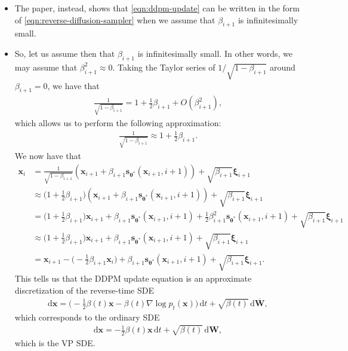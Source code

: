 \documentclass[10pt]{article}
\newcommand{\dee}{\mathrm{d}}
\newcommand{\ve}[1]{\mathbf{#1}}
\newcommand{\ves}[1]{\boldsymbol{#1}}
\begin{document}
\begin{itemize}
  \item The paper, instead, shows that \eqref{eqn:ddpm-update} can be written in the form of \eqref{eqn:reverse-diffusion-sampler} when we assume that $\beta_{i+1}$ is infinitesimally small.
  
  \item So, let us assume then that $\beta_{i+1}$ is infinitesimally small. In other words, we may assume that $\beta_{i+1}^2 \approx 0$. Taking the Taylor series of $1/\sqrt{1-\beta_{i+1}}$ around $\beta_{i+1} = 0$, we have that
  \begin{align*}
    \frac{1}{\sqrt{1 - \beta_{i+1}}} = 1 + \frac{1}{2}\beta_{i+1} + O(\beta_{i+1}^2),
  \end{align*}
  which allows us to perform the following approximation:
  \begin{align*}
    \frac{1}{\sqrt{1 - \beta_{i+1}}} \approx 1 + \frac{1}{2}\beta_{i+1}.
  \end{align*}
  We now have that
  \begin{align*}
    \ve{x}_{i}
    &= \frac{1}{\sqrt{1 - \beta_{i+1}}} (\ve{x}_{i+1} + \beta_{i+1}\ve{s}_{\ves{\theta}^*}(\ve{x}_{i+1}, i+1)) + \sqrt{\beta_{i+1}} \ves{\xi}_{i+1} \\
    &\approx \bigg(1 + \frac{1}{2}\beta_{i+1}\bigg)(\ve{x}_{i+1} + \beta_{i+1}\ve{s}_{\ves{\theta}^*}(\ve{x}_{i+1}, i+1)) + \sqrt{\beta_{i+1}} \ves{\xi}_{i+1} \\
    &= \bigg(1 + \frac{1}{2}\beta_{i+1}\bigg)\ve{x}_{i+1} + \beta_{i+1}\ve{s}_{\ves{\theta}^*}(\ve{x}_{i+1}, i+1) + \frac{1}{2}\beta_{i+1}^2 \ve{s}_{\ves{\theta}^*}(\ve{x}_{i+1}, i+1) + \sqrt{\beta_{i+1}} \ves{\xi}_{i+1} \\
    &\approx \bigg(1 + \frac{1}{2}\beta_{i+1}\bigg)\ve{x}_{i+1} + \beta_{i+1}\ve{s}_{\ves{\theta}^*}(\ve{x}_{i+1}, i+1) + \sqrt{\beta_{i+1}} \ves{\xi}_{i+1} \\
    &= \ve{x}_{i+1} - \bigg(-\frac{1}{2}\beta_{i+1}\ve{x}_i\bigg) + \beta_{i+1}\ve{s}_{\ves{\theta}^*}(\ve{x}_{i+1}, i+1) + \sqrt{\beta_{i+1}} \ves{\xi}_{i+1}.
  \end{align*}
  This tells us that the DDPM update equation is an approximate discretization of the reverse-time SDE
  \begin{align*}
    \dee \ve{x} = \bigg( -\frac{1}{2}\beta(t)\ve{x} - \beta(t) \nabla \log p_t(\ve{x}) \bigg)\, \dee t + \sqrt{\beta(t)}\, \dee\overline{\ve{W}},
  \end{align*}
  which corresponds to the ordinary SDE
  \begin{align*}
    \dee \ve{x} = -\frac{1}{2}\beta(t)\ve{x}\, \dee t + \sqrt{\beta(t)}\, \dee\ve{W},
  \end{align*}
  which is the VP SDE.
\end{itemize}
\end{document}
